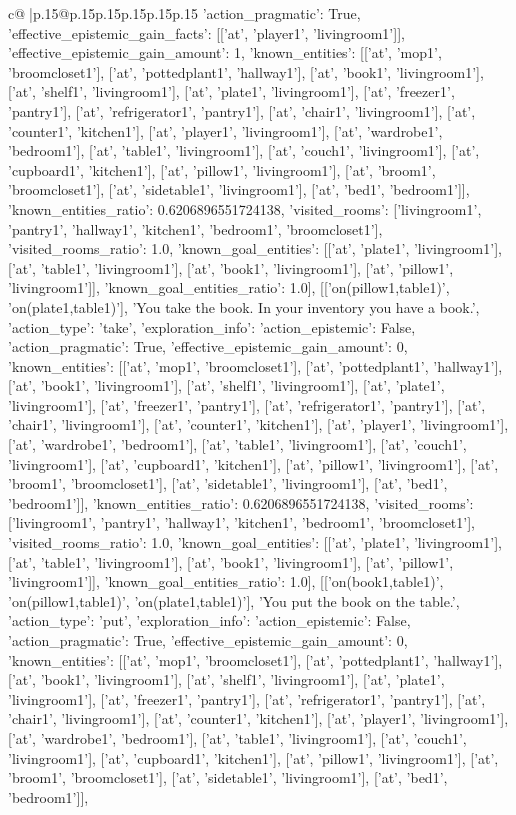 \documentclass{article}
\begin{document}
{\begin{supertabular}{c@{$\;$}|p{.15\linewidth}@{}p{.15\linewidth}p{.15\linewidth}p{.15\linewidth}p{.15\linewidth}p{.15\linewidth}}
{{{'action_pragmatic': True, 'effective_epistemic_gain_facts': [['at', 'player1', 'livingroom1']], 'effective_epistemic_gain_amount': 1, 'known_entities': [['at', 'mop1', 'broomcloset1'], ['at', 'pottedplant1', 'hallway1'], ['at', 'book1', 'livingroom1'], ['at', 'shelf1', 'livingroom1'], ['at', 'plate1', 'livingroom1'], ['at', 'freezer1', 'pantry1'], ['at', 'refrigerator1', 'pantry1'], ['at', 'chair1', 'livingroom1'], ['at', 'counter1', 'kitchen1'], ['at', 'player1', 'livingroom1'], ['at', 'wardrobe1', 'bedroom1'], ['at', 'table1', 'livingroom1'], ['at', 'couch1', 'livingroom1'], ['at', 'cupboard1', 'kitchen1'], ['at', 'pillow1', 'livingroom1'], ['at', 'broom1', 'broomcloset1'], ['at', 'sidetable1', 'livingroom1'], ['at', 'bed1', 'bedroom1']], 'known_entities_ratio': 0.6206896551724138, 'visited_rooms': ['livingroom1', 'pantry1', 'hallway1', 'kitchen1', 'bedroom1', 'broomcloset1'], 'visited_rooms_ratio': 1.0, 'known_goal_entities': [['at', 'plate1', 'livingroom1'], ['at', 'table1', 'livingroom1'], ['at', 'book1', 'livingroom1'], ['at', 'pillow1', 'livingroom1']], 'known_goal_entities_ratio': 1.0}}], [['on(pillow1,table1)', 'on(plate1,table1)'], 'You take the book. In your inventory you have a book.', {'action_type': 'take', 'exploration_info': {'action_epistemic': False, 'action_pragmatic': True, 'effective_epistemic_gain_amount': 0, 'known_entities': [['at', 'mop1', 'broomcloset1'], ['at', 'pottedplant1', 'hallway1'], ['at', 'book1', 'livingroom1'], ['at', 'shelf1', 'livingroom1'], ['at', 'plate1', 'livingroom1'], ['at', 'freezer1', 'pantry1'], ['at', 'refrigerator1', 'pantry1'], ['at', 'chair1', 'livingroom1'], ['at', 'counter1', 'kitchen1'], ['at', 'player1', 'livingroom1'], ['at', 'wardrobe1', 'bedroom1'], ['at', 'table1', 'livingroom1'], ['at', 'couch1', 'livingroom1'], ['at', 'cupboard1', 'kitchen1'], ['at', 'pillow1', 'livingroom1'], ['at', 'broom1', 'broomcloset1'], ['at', 'sidetable1', 'livingroom1'], ['at', 'bed1', 'bedroom1']], 'known_entities_ratio': 0.6206896551724138, 'visited_rooms': ['livingroom1', 'pantry1', 'hallway1', 'kitchen1', 'bedroom1', 'broomcloset1'], 'visited_rooms_ratio': 1.0, 'known_goal_entities': [['at', 'plate1', 'livingroom1'], ['at', 'table1', 'livingroom1'], ['at', 'book1', 'livingroom1'], ['at', 'pillow1', 'livingroom1']], 'known_goal_entities_ratio': 1.0}}], [['on(book1,table1)', 'on(pillow1,table1)', 'on(plate1,table1)'], 'You put the book on the table.', {'action_type': 'put', 'exploration_info': {'action_epistemic': False, 'action_pragmatic': True, 'effective_epistemic_gain_amount': 0, 'known_entities': [['at', 'mop1', 'broomcloset1'], ['at', 'pottedplant1', 'hallway1'], ['at', 'book1', 'livingroom1'], ['at', 'shelf1', 'livingroom1'], ['at', 'plate1', 'livingroom1'], ['at', 'freezer1', 'pantry1'], ['at', 'refrigerator1', 'pantry1'], ['at', 'chair1', 'livingroom1'], ['at', 'counter1', 'kitchen1'], ['at', 'player1', 'livingroom1'], ['at', 'wardrobe1', 'bedroom1'], ['at', 'table1', 'livingroom1'], ['at', 'couch1', 'livingroom1'], ['at', 'cupboard1', 'kitchen1'], ['at', 'pillow1', 'livingroom1'], ['at', 'broom1', 'broomcloset1'], ['at', 'sidetable1', 'livingroom1'], ['at', 'bed1', 'bedroom1']], }}}
\end{supertabular}}
\end{document}
